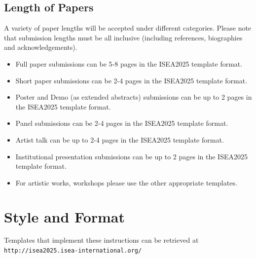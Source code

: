 \documentclass[letterpaper]{article}
\begin{document}

\subsection{Length of Papers}

A variety of paper lengths will be accepted under different categories. Please note that submission lengths must be all inclusive (including references, biographies and acknowledgements).
\begin{itemize}
\item Full paper submissions can be 5-8 pages in the ISEA2025 template format.
\item Short paper submissions can be 2-4 pages in the ISEA2025 template format.
\item Poster and Demo (as extended abstracts) submissions can be up to 2 pages in the ISEA2025 template format.
\item Panel submissions can be 2-4 pages in the ISEA2025 template format.
\item Artist talk can be up to 2-4 pages in the ISEA2025 template format.
\item Institutional presentation submissions can be up to 2 pages in the ISEA2025 template format.
\item For artistic works, workshops please use the other appropriate templates.
\end{itemize}

\section{Style and Format}
Templates that implement these instructions can be retrieved at  {\small \tt http://isea2025.isea-international.org/}
\end{document}
